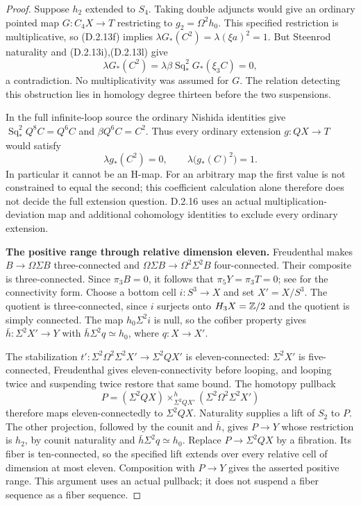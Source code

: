 \begin{proof}
Suppose $h_2$ extended to $S_4$. Taking double adjuncts would give
an ordinary pointed map $G:C_4X\to T$ restricting to
$g_2=\Omega^2h_0$. This specified restriction is multiplicative,
so \textup{(D.2.13f)} implies
$\lambda G_*(C^2)=\lambda(\xi a)^2=1$.
But Steenrod naturality and \textup{(D.2.13i),(D.2.13l)} give
\[
 \lambda G_*(C^2)
   =\lambda\beta\operatorname{Sq}_*^2G_*(\xi_3C)=0,
 \tag{D.2.13m}
\]
a contradiction. No multiplicativity was assumed for $G$.
The relation detecting this obstruction lies in homology degree
thirteen before the two suspensions.

In the full infinite-loop source the ordinary Nishida identities
give $\operatorname{Sq}_*^2Q^8C=Q^6C$ and $\beta Q^6C=C^2$.
Thus every ordinary extension $g:QX\to T$ would satisfy
\[
 \lambda g_*(C^2)=0,
 \qquad \lambda\bigl(g_*(C)^2\bigr)=1.
 \tag{D.2.13n}
\]
In particular it cannot be an H-map. For an arbitrary map the
first value is not constrained to equal the second; this coefficient
calculation alone therefore does not decide the full extension
question. D.2.16 uses an actual multiplication-deviation map and
additional cohomology identities to exclude every ordinary extension.

\medskip\noindent
\textbf{The positive range through relative dimension eleven.}
Freudenthal makes $B\to\Omega\Sigma B$ three-connected and
$\Omega\Sigma B\to\Omega^2\Sigma^2B$ four-connected.
Their composite is three-connected. Since $\pi_3B=0$, it follows
that $\pi_5Y=\pi_3T=0$; see
\cite[Corollary~4.24]{FGHHatcher2002} for the connectivity form.
Choose a bottom cell $i:S^3\to X$ and set $X'=X/S^3$.
The quotient is three-connected, since $i$ surjects onto
$H_3X=\mathbb Z/2$ and the quotient is simply connected.
The map $h_0\Sigma^2i$ is null, so the cofiber property gives
$\bar h:\Sigma^2X'\to Y$ with $\bar h\Sigma^2q\simeq h_0$,
where $q:X\to X'$.

The stabilization
$t':\Sigma^2\Omega^2\Sigma^2X'\to\Sigma^2QX'$
is eleven-connected: $\Sigma^2X'$ is five-connected,
Freudenthal gives eleven-connectivity before looping, and
looping twice and suspending twice restore that same bound.
The homotopy pullback
\[
 P=(\Sigma^2QX)\times^h_{\Sigma^2QX'}
                 (\Sigma^2\Omega^2\Sigma^2X')
 \tag{D.2.13o}
\]
therefore maps eleven-connectedly to $\Sigma^2QX$.
Naturality supplies a lift of $S_2$ to $P$. The other projection,
followed by the counit and $\bar h$, gives $P\to Y$ whose
restriction is $h_2$, by counit naturality and
$\bar h\Sigma^2q\simeq h_0$.
Replace $P\to\Sigma^2QX$ by a fibration. Its fiber is
ten-connected, so the specified lift extends over every relative
cell of dimension at most eleven. Composition with $P\to Y$
gives the asserted positive range. This argument uses an actual
pullback; it does not suspend a fiber sequence as a fiber sequence.


\end{proof}

